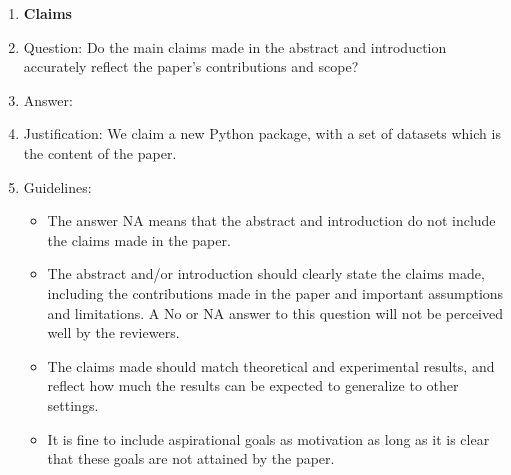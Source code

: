 \documentclass{article}
\begin{document}
\begin{enumerate}

\item {\bf Claims}
    \item[] Question: Do the main claims made in the abstract and introduction accurately reflect the paper's contributions and scope?
    \item[] Answer: \answerYes{} %
    \item[] Justification: We claim a new Python package, with a set of datasets which is the content of the paper.
    \item[] Guidelines:
    \begin{itemize}
        \item The answer NA means that the abstract and introduction do not include the claims made in the paper.
        \item The abstract and/or introduction should clearly state the claims made, including the contributions made in the paper and important assumptions and limitations. A No or NA answer to this question will not be perceived well by the reviewers. 
        \item The claims made should match theoretical and experimental results, and reflect how much the results can be expected to generalize to other settings. 
        \item It is fine to include aspirational goals as motivation as long as it is clear that these goals are not attained by the paper. 
    \end{itemize}


\end{enumerate}
\end{document}
